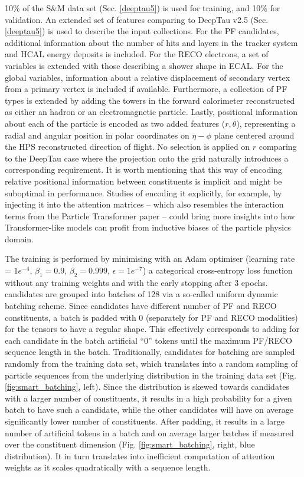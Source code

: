 10\% of the S\&M data set (Sec. \ref{deeptau5}) is used for training, and 10\% for validation. An extended set of features comparing to DeepTau v2.5 (Sec.\ref{deeptau5}) is used to describe the input collections. For the PF candidates, additional information about the number of hits and layers in the tracker system and HCAL energy deposits is included. For the RECO electrons, a set of variables is extended with those describing a shower shape in ECAL. For the global variables, information about a relative displacement of secondary vertex from a primary vertex is included if available.  Furthermore, a collection of PF types is extended by adding the towers in the forward calorimeter reconstructed as either an hadron or an electromagnetic particle. Lastly, positional information about each of the particle is encoded as two added features ($r, \theta$), representing a radial and angular position in polar coordinates on $\eta-\phi$ plane centered around the HPS reconstructed \tauh direction of flight. No selection is applied on $r$ comparing to the DeepTau case where the projection onto the grid naturally introduces a corresponding requirement. It is worth mentioning that this way of encoding relative positional information between constituents is implicit and might be suboptimal in performance. Studies of encoding it explicitly, for example, by injecting it into the attention matrices \cite{chen2021demystifying}  -- which also resembles the interaction terms from the Particle Transformer paper -- could bring more insights into how Transformer-like models can profit from inductive biases of the particle physics domain.

The training is performed by minimising with an Adam optimiser (learning rate = $1e^{-4}$, $\beta_1=0.9$, $\beta_2=0.999$, $\epsilon=1e^{-7}$) a categorical cross-entropy loss function without any training weights and with the early stopping after 3 epochs. \tauh candidates are grouped into batches of 128 via a so-called uniform dynamic batching scheme. Since \tauh candidates have different number of PF and RECO constituents, a batch is padded with 0 (separately for PF and RECO modalities) for the tensors to have a regular shape. This effectively corresponds to adding for each \tauh candidate in the batch artificial \enquote{0} tokens until the maximum PF/RECO sequence length in the batch. Traditionally, \tauh candidates for batching are sampled randomly from the training data set, which translates into a random sampling of particle sequences from the underlying distribution in the training data set (Fig. \ref{fig:smart_batching}, left). Since the distribution is skewed towards \tauh candidates with a larger number of constituents, it results in a high probability for a given batch to have such a \tauh candidate, while the other \tauh candidates will have on average significantly lower number of constituents. After padding, it results in a large number of artificial tokens in a batch and on average larger batches if measured over the constituent dimension (Fig. \ref{fig:smart_batching}, right, blue distribution). It in turn translates into inefficient computation of attention weights as it scales quadratically with a sequence length. 

